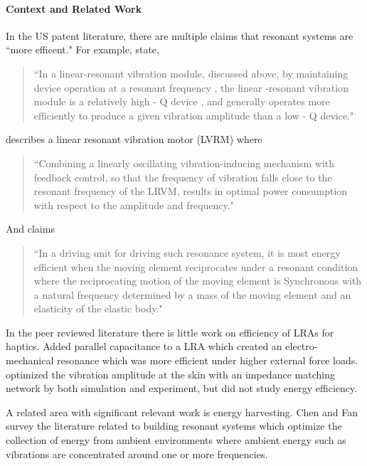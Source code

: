 \documentclass[letterpaper,11pt]{article}
\begin{document}
\paragraph{Context and Related Work}

In the US patent literature, there are multiple claims that resonant systems are ``more efficent."
For example, \cite{elenga2014linear, elenga2018linear} state,
\begin{quotation}
``In a linear-resonant vibration module, discussed above, by
maintaining device operation at a resonant frequency , the
linear -resonant vibration module is a relatively high - Q
device , and generally operates more efficiently to produce a
given vibration amplitude than a low - Q device."
\end{quotation}
\cite{Pepin2010linear} describes a linear resonant vibration motor (LVRM) where
\begin{quotation}
``Combining a linearly oscillating vibration-inducing mechanism with feedback control, so that the
frequency of vibration falls close to the resonant frequency of the
LRVM, results in optimal power consumption
with respect to the amplitude and frequency."
\end{quotation}
And \cite{Izumi2005Resonant} claims
\begin{quotation} ``In a driving unit for driving such resonance system,
it is most energy efficient when the moving element
reciprocates under a resonant condition where the reciprocating
motion of the moving element is Synchronous with a natural
frequency determined by a mass of the moving element and
an elasticity of the elastic body."
\end{quotation}

In the peer reviewed literature there is little work on efficiency of LRAs for haptics.
\cite{kato2018characteristic} Added parallel capacitance to a LRA which created an
electro-mechanical resonance which was more efficient under higher external force loads.
\cite{lindsay2013improving} optimized the vibration amplitude at the skin with
an impedance matching network by both simulation and experiment,
but did not study energy efficiency.

A related area with significant relevant work is energy harvesting.
Chen and Fan \cite{chen2023internal} survey the literature related to
building resonant systems which optimize the collection
of energy from ambient environments where ambient  energy such as vibrations are concentrated around
one or more frequencies.
\end{document}
